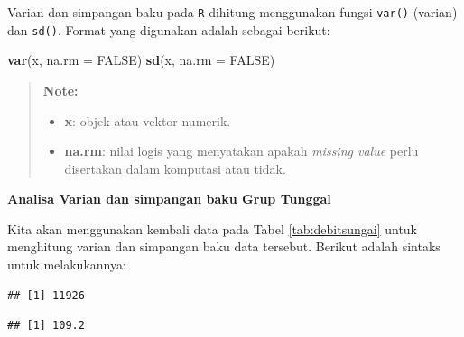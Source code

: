 \documentclass[]{book}
\newenvironment{Shaded}{\begin{snugshade}}{\end{snugshade}}
\newcommand{\KeywordTok}[1]{\textcolor[rgb]{0.13,0.29,0.53}{\textbf{#1}}}
\newcommand{\DataTypeTok}[1]{\textcolor[rgb]{0.13,0.29,0.53}{#1}}
\newcommand{\CommentTok}[1]{\textcolor[rgb]{0.56,0.35,0.01}{\textit{#1}}}
\newcommand{\OtherTok}[1]{\textcolor[rgb]{0.56,0.35,0.01}{#1}}
\newcommand{\OperatorTok}[1]{\textcolor[rgb]{0.81,0.36,0.00}{\textbf{#1}}}
\newcommand{\NormalTok}[1]{#1}
\providecommand{\tightlist}{%
  \setlength{\itemsep}{0pt}\setlength{\parskip}{0pt}}
\begin{document}
Varian dan simpangan baku pada \texttt{R} dihitung menggunakan fungsi
\texttt{var()} (varian) dan \texttt{sd()}. Format yang digunakan adalah
sebagai berikut:

\begin{Shaded}
\begin{Highlighting}[]
\KeywordTok{var}\NormalTok{(x, }\DataTypeTok{na.rm =} \OtherTok{FALSE}\NormalTok{)}
\KeywordTok{sd}\NormalTok{(x, }\DataTypeTok{na.rm =} \OtherTok{FALSE}\NormalTok{)}
\end{Highlighting}
\end{Shaded}

\begin{quote}
\textbf{Note:}

\begin{itemize}
\tightlist
\item
  \textbf{x}: objek atau vektor numerik.
\item
  \textbf{na.rm}: nilai logis yang menyatakan apakah \emph{missing
  value} perlu disertakan dalam komputasi atau tidak.
\end{itemize}
\end{quote}

\textbf{Analisa Varian dan simpangan baku Grup Tunggal}

Kita akan menggunakan kembali data pada Tabel \ref{tab:debitsungai}
untuk menghitung varian dan simpangan baku data tersebut. Berikut adalah
sintaks untuk melakukannya:

\begin{Shaded}
\end{Shaded}

\begin{verbatim}
## [1] 11926
\end{verbatim}

\begin{Shaded}
\end{Shaded}

\begin{verbatim}
## [1] 109.2
\end{verbatim}
\end{document}
